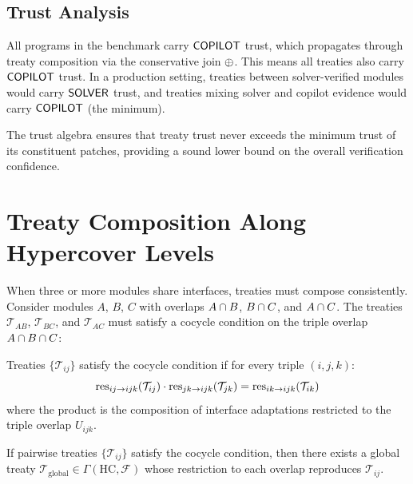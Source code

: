 \documentclass[11pt]{article}
\newcommand{\treaty}{\mathcal{T}}
\newcommand{\HC}{\mathrm{HC}}
\newcommand{\Sect}{\mathcal{F}}             %
\begin{document}
\subsection{Trust Analysis}

All \expTrustCOPILOTSUGGESTED{} programs in the benchmark carry
$\mathsf{COPILOT}$ trust, which propagates through treaty composition via
the conservative join $\oplus$.  This means all treaties also carry
$\mathsf{COPILOT}$ trust.  In a production setting, treaties between
solver-verified modules would carry $\mathsf{SOLVER}$ trust, and treaties
mixing solver and copilot evidence would carry $\mathsf{COPILOT}$ (the
minimum).

The trust algebra ensures that treaty trust never exceeds the minimum
trust of its constituent patches, providing a sound lower bound on
the overall verification confidence.

\section{Treaty Composition Along Hypercover Levels}\label{sec:composition}

When three or more modules share interfaces, treaties must compose
consistently.  Consider modules $A$, $B$, $C$ with overlaps
$A \cap B$, $B \cap C$, and $A \cap C$.  The
treaties $\treaty_{AB}$, $\treaty_{BC}$, and $\treaty_{AC}$ must
satisfy a cocycle condition on the triple overlap
$A \cap B \cap C$:

\begin{definition}\label{def:cocycle}
Treaties $\{\treaty_{ij}\}$ satisfy the cocycle condition if for
every triple $(i, j, k)$:
\[
  \res_{ij \to ijk}(\treaty_{ij}) \cdot
  \res_{jk \to ijk}(\treaty_{jk}) =
  \res_{ik \to ijk}(\treaty_{ik})
\]
where the product is the composition of interface adaptations
restricted to the triple overlap $U_{ijk}$.
\end{definition}

\begin{theorem}\label{thm:composition}
If pairwise treaties $\{\treaty_{ij}\}$ satisfy the cocycle condition,
then there exists a global treaty
$\treaty_{\mathrm{global}} \in \Gamma(\HC, \Sect)$ whose restriction
to each overlap reproduces $\treaty_{ij}$.
\end{theorem}
\end{document}
